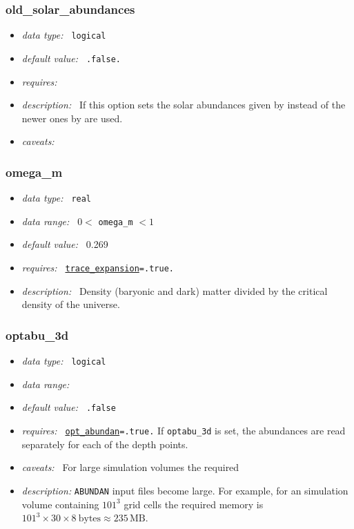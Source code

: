 \documentclass[a4paper,10pt]{article}
\begin{document}
\subsubsection{old\_solar\_abundances}
\label{opt:oldsolarabundances}
\begin{itemize}
 \item \textit{data type:~} \texttt{logical}
 \item \textit{default value:~} \texttt{.false.}
 \item \textit{requires:~}
 \item \textit{description:~} If this option sets the solar abundances given   
  by \cite{Grevesse1998} instead of the newer ones by \cite{Asplund2009} are 
  used.
 \item \textit{caveats:~}
\end{itemize}

\subsubsection{omega\_m}
\label{opt:omegam}
\begin{itemize}
 \item \textit{data type:~} \texttt{real}
 \item \textit{data range:~} $0 < $ \texttt{omega\_m} $<1$
 \item \textit{default value:~} 0.269
 \item \textit{requires:~} \texttt{\hyperref[opt:traceexpansion]{trace\_expansion}=.true.}
 \item \textit{description:~} Density (baryonic and dark) matter divided by the  
  critical density of the universe.  
\end{itemize}


\subsubsection{optabu\_3d}
\label{opt:optabu3d}
\begin{itemize}
 \item \textit{data type:~} \texttt{logical}
 \item \textit{data range:~}
 \item \textit{default value:~} \texttt{.false}
 \item \textit{requires:~} \texttt{\hyperref[opt:oabundan]{opt\_abundan}=.true.}
 If \texttt{optabu\_3d} is set, the abundances are read separately for each of 
 the depth points. 
 \item \textit{caveats:~} For large simulation volumes the required 
 \item \textit{description: }\texttt{ABUNDAN} input files become large. For 
  example, for an simulation  volume containing $101^3$ grid cells the required 
  memory is
 $
 101^3 \times 30 \times 8~\mbox{bytes} \approx 235\,\mathrm{MB}.  
 $
\end{itemize}
\end{document}
